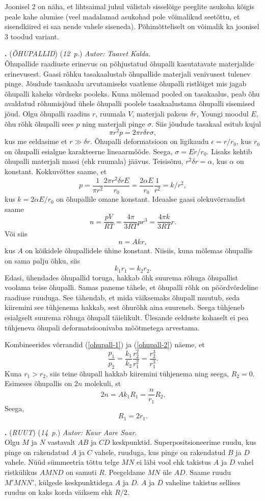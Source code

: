 \documentclass[11pt,a5paper]{article}
\newcommand{\numb}[1]{\vspace{5pt}\textbf{\large #1}}
\newcommand{\nimi}[1]{(\textsl{\small #1})}
\newcommand{\punktid}[1]{(\emph{#1~p.})}
\newcounter{ylesanne}
\newcommand{\yl}[1]{\addtocounter{ylesanne}{1}\numb{\theylesanne.} \nimi{#1} \newblock{}}
\newcommand{\autor}[1]{\emph{ Autor: #1.\\}}
\begin{document}
Joonisel 2 on näha, et lihtsaimal juhul välistab sisselõige peeglite asukoha kõigis peale kahe alumise (veel madalamad asukohad pole võimalikud seetõttu, et sisendkiired ei saa nende vahele siseneda). Põhimõtteliselt on võimalik ka joonisel 3 toodud variant.

\yl{ÕHUPALLID}
\punktid{12}
\autor{Taavet Kalda}
Õhupallide raadiuste erinevus on põhjustatud õhupalli kasutatavate materjalide erinevusest. Gaasi rõhku tasakaalustab õhupallide materjali venivusest tulenev pinge. Jõudude tasakaalu arvutamiseks vaatleme õhupalli ristlõiget mis jagab õhupalli kaheks võrdseks pooleks. Kuna mõlemad pooled on tasakaalus, peab õhu avaldatud rõhumisjõud ühele õhupalli poolele tasakaalustama õhupalli sisemised jõud. Olgu õhupalli raadius $r$, ruumala $V$, materjali paksus $\delta r$, Youngi moodul $E$, õhu rõhk õhupalli sees $p$ ning materjali pinge $\sigma$. Siis jõudude tasakaal esitub kujul
\[
\pi r^2 p = 2\pi r\delta r \sigma,
\]
kus me eeldasime et $r \gg \delta r$. Õhupalli deformatsioon on ligikaudu $\epsilon = r / r_0$, kus $r_0$ on õhupalli esialgne karakteerne lineaarmõõde. Seega, $\sigma = Er/r_0$. Lisaks kehtib õhupalli materjali massi (ehk ruumala) jäävus. Teisisõnu, $r^2\delta r = \alpha$, kus $\alpha$ on konstant. Kokkuvõttes saame, et
\begin{equation}
p = \frac{1}{\pi r^2} \frac{2\pi r^2\delta rE}{r_0} = \frac{2\alpha E}{r_0}\frac{1}{r^2}  = k/r^2,
\label{ohupall-1}
\end{equation}
kus $k = 2\alpha E/r_0$ on õhupallile omane konstant. Ideaalse gaasi olekuvõrrandist saame
\[
n = \frac{pV}{RT} = \frac{4\pi}{3RT}pr^3 = \frac{4\pi k}{3RT}r.
\]
Või siis
\[
n = Akr,
\]
kus $A$ on kõikidele õhupallidele ühine konstant. Niisiis, kuna mõlemas õhupallis on sama palju õhku, siis
\begin{equation}
k_1r_1 = k_2r_2.
\label{ohupall-2}
\end{equation}
Edasi, ühendades õhupallid toruga, hakkab õhk suurema rõhuga õhupallist voolama teise õhupalli. Samas paneme tähele, et õhupalli rõhk on pöördvõrdeline raadiuse ruuduga. See tähendab, et mida väiksemaks õhupall muutub, seda kiiremini see tühjenema hakkab, sest õhurõhk aina suureneb. Seega tühjeneb esialgselt suurema rõhuga õhupall täielikult. Ülesande eelduste kohaselt ei pea tühjeneva õhupali deformatsioonivaba mõõtmetega arvestama.

Kombineerides võrrandid (\ref{ohupall-1}) ja (\ref{ohupall-2}) näeme, et
\[
\frac{p_1}{p_2} = \frac{k_1}{k_2} \frac{r_2^2}{r_1^2} = \frac{r_2^3}{r_1^3}.
\]
Kuna $r_1 > r_2$, siis teine õhupall hakkab kiiremini tühjenema ning seega, $R_2 = 0$. Esimeses õhupallis on $2n$ molekuli, st
\[
2n = Ak_1 R_1 = \frac{n}{r_1}R_2.
\]
Seega,
\[
R_1 = 2r_1.
\]

\yl{RUUT}
\punktid{14}
\autor{Kaur Aare Saar}
Olgu $M$ ja $N$ vastavalt $AB$ ja $CD$ keskpunktid. Superpositsioneerime
ruudu, kus pinge on rakendatud $A$ ja $C$ vahele, ruuduga, kus pinge on
rakendatud $B$ ja $D$ vahele. Nüüd sümmeetria tõttu telge $MN$ ei läbi vool
ehk takistus $A$ ja $D$ vahel ristkülikus $AMND$ on samuti $R$. Peegeldame
$MN$ üle $AD$. Saame ruudu $M'MNN'$, külgede keskpunktidega $A$ ja $D$. $A$ ja
$D$ vaheline takistus sellises ruudus on kaks korda väiksem ehk $R/2$.
\end{document}
